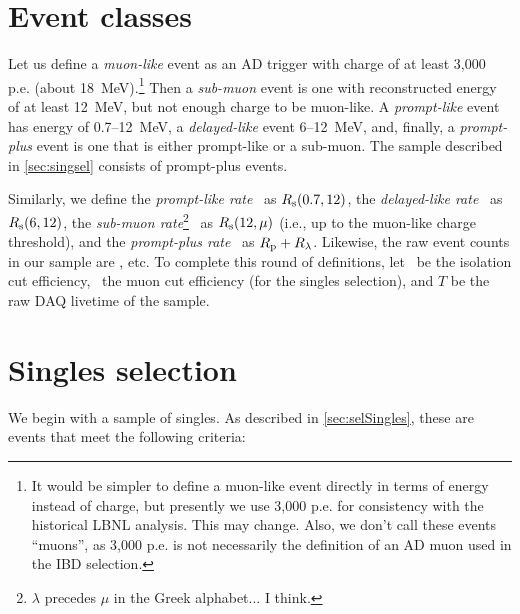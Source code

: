 \documentclass[../thesis.tex]{subfiles}
\begin{document}
\section{Event classes}
\label{sec:accdmcevtcls}

Let us define a \emph{muon-like} event as an AD trigger with charge of at least
3,000 p.e. (about 18~MeV).\footnote{It would be simpler to define a muon-like
  event directly in terms of energy instead of charge, but presently we use
  3,000 p.e. for consistency with the historical LBNL analysis. This may change.
  Also, we don't call these events ``muons'', as 3,000 p.e. is not necessarily
  the definition of an AD muon used in the IBD selection.} Then a
\emph{sub-muon} event is one with reconstructed energy of at least 12~MeV, but
not enough charge to be muon-like. A \emph{prompt-like} event has energy of
0.7--12~MeV, a \emph{delayed-like} event 6--12~MeV, and, finally, a
\emph{prompt-plus} event is one that is either prompt-like or a sub-muon. The
sample described in \autoref{sec:singsel} consists of prompt-plus events.

Similarly, we define the \emph{prompt-like rate} \Rpro\ as $R_\mathrm{s}(0.7, 12)$, the
\emph{delayed-like rate} \Rdel\ as $R_\mathrm{s}(6, 12)$, the \emph{sub-muon
  rate}\footnote{$\lambda$ precedes $\mu$ in the Greek alphabet... I think.}
\Rsub\ as $R_\mathrm{s}(12, \mu)$ (i.e., up to the muon-like charge threshold), and the
\emph{prompt-plus rate} \Rplu\ as $R_\mathrm{p} + R_\mathrm{\lambda}$. Likewise, the raw event
counts in our sample are \Npro, etc. To complete this round of definitions, let
\eisol\ be the isolation cut efficiency, \emu\ the muon cut efficiency (for the
singles selection), and $T$ be the raw DAQ livetime of the sample.

\section{Singles selection}
\label{sec:singsel}

We begin with a sample of singles. As described in \autoref{sec:selSingles}, these are events that meet the following criteria:

\end{document}
